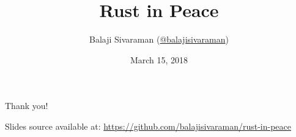 \documentclass[bigger]{beamer}
\author{Balaji Sivaraman (\href{https://twitter.com/balajisivaraman}{@balajisivaraman})}
\date{March 15, 2018}
\title{Rust in Peace}
\institute{ThoughtWorks}
\begin{document}
\maketitle



\begin{frame}
  \centerline{
    \huge{Thank you!}
  }
  \centerline{
    \footnotesize{Slides source available at: \href{https://github.com/balajisivaraman/rust-in-peace}{https://github.com/balajisivaraman/rust-in-peace}}
  }
\end{frame}
\end{document}
